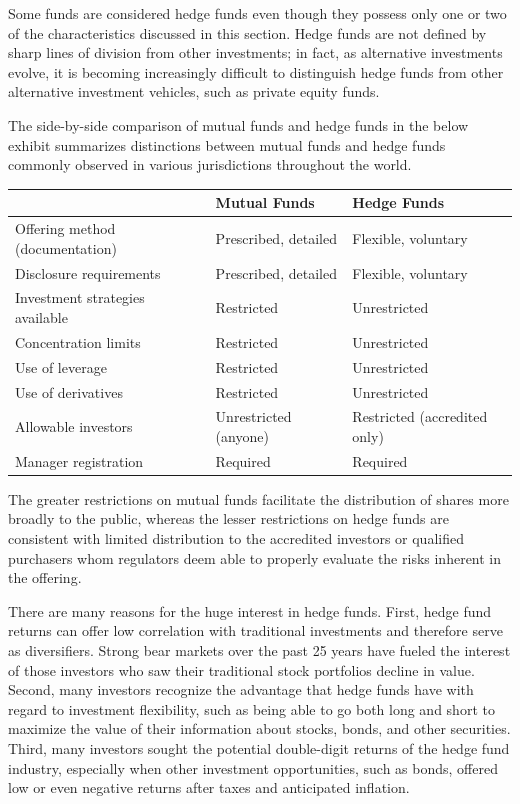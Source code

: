 \documentclass[11pt]{article}
\begin{document}
Some funds are considered hedge funds even though they possess only one or two of the characteristics discussed in this section. Hedge funds are not defined by sharp lines of division from other investments; in fact, as alternative investments evolve, it is becoming increasingly difficult to distinguish hedge funds from other alternative investment vehicles, such as private equity funds.

The side-by-side comparison of mutual funds and hedge funds in the below exhibit summarizes distinctions between mutual funds and hedge funds commonly observed in various jurisdictions throughout the world.

\begin{center}
\begin{tabular}{|lll|}
\hline
 & Mutual Funds & Hedge Funds \\
\hline
Offering method (documentation) & Prescribed, detailed & Flexible, voluntary \\
Disclosure requirements & Prescribed, detailed & Flexible, voluntary \\
Investment strategies available & Restricted & Unrestricted \\
Concentration limits & Restricted & Unrestricted \\
Use of leverage & Restricted & Unrestricted \\
Use of derivatives & Restricted & Unrestricted \\
Allowable investors & Unrestricted (anyone) & Restricted (accredited only) \\
Manager registration & Required & Required \\
\hline
\end{tabular}
\end{center}

The greater restrictions on mutual funds facilitate the distribution of shares more broadly to the public, whereas the lesser restrictions on hedge funds are consistent with limited distribution to the accredited investors or qualified purchasers whom regulators deem able to properly evaluate the risks inherent in the offering.

There are many reasons for the huge interest in hedge funds. First, hedge fund returns can offer low correlation with traditional investments and therefore serve as diversifiers. Strong bear markets over the past 25 years have fueled the interest of those investors who saw their traditional stock portfolios decline in value. Second, many investors recognize the advantage that hedge funds have with regard to investment flexibility, such as being able to go both long and short to maximize the value of their information about stocks, bonds, and other securities. Third, many investors sought the potential double-digit returns of the hedge fund industry, especially when other investment opportunities, such as bonds, offered low or even negative returns after taxes and anticipated inflation.
\end{document}
